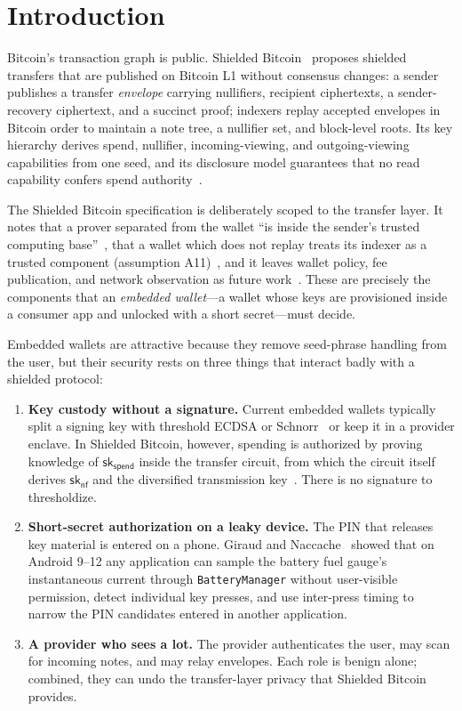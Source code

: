 \documentclass[11pt]{article}
\theoremstyle{remark}
\newcommand{\sk}{\mathsf{sk}}
\newcommand{\SB}{Shielded Bitcoin}
\begin{document}
\section{Introduction}

Bitcoin's transaction graph is public. \SB{}~\cite{sb26} proposes shielded transfers that are published on Bitcoin L1 without consensus changes: a sender publishes a transfer \emph{envelope} carrying nullifiers, recipient ciphertexts, a sender-recovery ciphertext, and a succinct proof; indexers replay accepted envelopes in Bitcoin order to maintain a note tree, a nullifier set, and block-level roots. Its key hierarchy derives spend, nullifier, incoming-viewing, and outgoing-viewing capabilities from one seed, and its disclosure model guarantees that no read capability confers spend authority~\cite[§6--7]{sb26}.

The \SB{} specification is deliberately scoped to the transfer layer. It notes that a prover separated from the wallet ``is inside the sender's trusted computing base''~\cite[§10]{sb26}, that a wallet which does not replay treats its indexer as a trusted component (assumption A11)~\cite[§17]{sb26}, and it leaves wallet policy, fee publication, and network observation as future work~\cite[§22]{sb26}. These are precisely the components that an \emph{embedded wallet}---a wallet whose keys are provisioned inside a consumer app and unlocked with a short secret---must decide.

Embedded wallets are attractive because they remove seed-phrase handling from the user, but their security rests on three things that interact badly with a shielded protocol:
\begin{enumerate}
  \item \textbf{Key custody without a signature.} Current embedded wallets typically split a signing key with threshold ECDSA or Schnorr~\cite{gg18,frost20} or keep it in a provider enclave. In \SB{}, however, spending is authorized by proving knowledge of $\sk_{\mathsf{spend}}$ inside the transfer circuit, from which the circuit itself derives $\sk_{\mathsf{nf}}$ and the diversified transmission key~\cite[§9, §14]{sb26}. There is no signature to thresholdize.
  \item \textbf{Short-secret authorization on a leaky device.} The PIN that releases key material is entered on a phone. Giraud and Naccache~\cite{gn23} showed that on Android 9--12 any application can sample the battery fuel gauge's instantaneous current through \texttt{BatteryManager} without user-visible permission, detect individual key presses, and use inter-press timing to narrow the PIN candidates entered in another application.
  \item \textbf{A provider who sees a lot.} The provider authenticates the user, may scan for incoming notes, and may relay envelopes. Each role is benign alone; combined, they can undo the transfer-layer privacy that \SB{} provides.
\end{enumerate}
\end{document}

